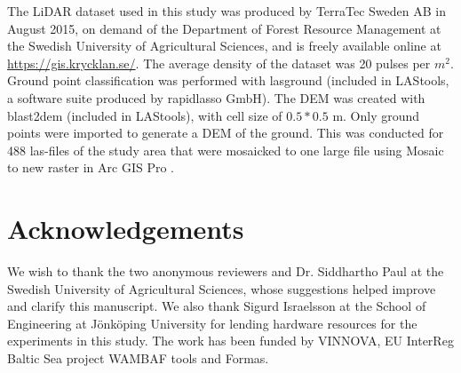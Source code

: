 \documentclass[]{interact}
\theoremstyle{plain}%
\theoremstyle{definition}
\theoremstyle{remark}
\begin{document}
\label{lidartodem}
The LiDAR dataset used in this study was produced by TerraTec Sweden AB in August 2015, on demand of the Department of Forest Resource Management at the Swedish University of Agricultural Sciences, and is freely available online at \href{https://gis.krycklan.se/}{https://gis.krycklan.se/}. The average density of the dataset was 20 pulses per $m^2$.  Ground point classification was performed with lasground (included in LAStools, a software suite produced by rapidlasso GmbH). The DEM was created with blast2dem (included in LAStools),  with cell size of $0.5*0.5$ m. Only ground points were imported  to generate a DEM of the ground. This was conducted for 488 las-files of the study area that were mosaicked to one large file using Mosaic to new raster in Arc GIS Pro \citep{EsriArcGisBook}.

\section*{Acknowledgements}
We wish to thank the two anonymous reviewers and Dr. Siddhartho Paul at the Swedish University of Agricultural Sciences, whose suggestions helped improve and clarify this manuscript. We also thank Sigurd Israelsson at the School of Engineering at J\"onk\"oping University for lending hardware resources for the experiments in this study. The work has been funded by VINNOVA, EU InterReg Baltic Sea project WAMBAF tools and Formas.



\label{references}



\end{document}
